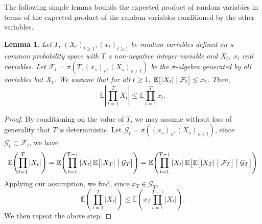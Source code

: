\documentclass[11pt]{article}
\newtheorem{lemma}{Lemma}
\newcommand{\dE}{\mathbb {E}}
\newcommand{\cF}{\mathcal {F}}
\newcommand{\cG}{\mathcal {G}}
\newcommand{\ABS}[1]{{{\left| #1 \right|}}} %
\newcommand{\SBRA}[1]{{{\left[#1\right]}}} %
\newcommand{\PAR}[1]{{{\left(#1\right)}}} %
\newcommand{\1}{1\!\!{\sf I}}\newcommand{\IND}{\1}
\begin{document}
The following simple lemma  bounds the expected product of random variables in terms of the expected product of the random variables conditioned by the other variables. 
\begin{lemma}\label{le:condexp}
Let $T$, $(X_t)_{t \geq 1}, (x_t)_{t \geq 1}$ be random variables defined on a common probability space with $T$ a non-negative integer variable and $X_t$, $x_t$ real variables. Let $\cF_t = \sigma(T , (x_s)_{s},  (X_s)_{s \ne t})$ be the $\sigma$-algebra generated by all variables but $X_t$. We assume that for all $t \geq 1$,  $\dE \SBRA{ | X_t | \bigm| \cF_t } \leq x_t$. Then,
$$
\dE \ABS{  \prod_{t=1} ^T X_t } \leq \dE \prod_{t = 1}^T x_t .  
$$ 
\end{lemma}
\begin{proof}
By conditioning on the value of $T$, we may assume without loss of generality that $T$ is deterministic.  Let $\cG_t = \sigma ( (x_s)_s , (X_s)_{s < t})$, since $\cG_t \subset \cF_t$, we have
$$
 \dE \PAR{ \prod_{t=1}^T |X_t| } = \dE \PAR{ \prod_{t=1}^{T-1} |X_t| \,  \dE \SBRA{ |X_T| \bigm| \cG_T } } =  \dE \PAR{   \prod_{t=1}^{T-1} |X_t| \,  \dE \SBRA{ \dE \SBRA{ |X_T| \bigm|\cF_T } \bigm|  \cG_T } } 
$$
Applying our assumption, we find, since $x_T \in \cG_T$, 
$$
 \dE \PAR{  \prod_{t=1}^T |X_t| } \leq \dE \PAR{ x_T \prod_{t=1}^{T-1} |X_t|} .
$$
We then repeat the above step.
\end{proof}
\end{document}
